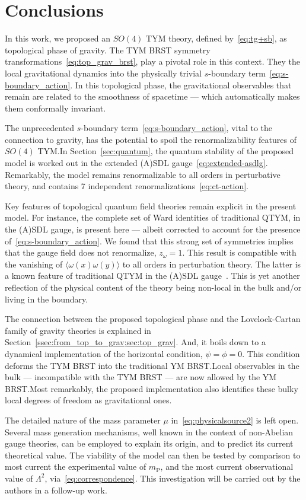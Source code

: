 \documentclass[main.tex]{subfiles}
\begin{document}
\section{Conclusions}%
\label{sec:conclusions}

In this work, we proposed an $ SO \left( 4 \right) $ TYM theory, defined by~\eqref{eq:tg+sb}, as topological phase of gravity. The TYM BRST symmetry transformations~\eqref{eq:top_grav_brst}, play a pivotal role in this context. They  the local gravitational dynamics into the physically trivial $s$-boundary term~\eqref{eq:s-boundary_action}. In this topological phase, the gravitational observables that remain are related to the smoothness of spacetime --- which automatically makes them conformally invariant.

The unprecedented $ s $-boundary term~\eqref{eq:s-boundary_action}, vital to the connection to gravity, has the potential to spoil the renormalizability features of $ SO(4) $ TYM.\@ In Section~\ref{sec:quantum}, the quantum stability of the proposed model is worked out in the extended (A){}SDL gauge~\eqref{eq:extended-asdlg}. Remarkably, the model remains renormalizable to all orders in perturbative theory, and contains 7 independent renormalizations~\eqref{eq:ct-action}.

Key features of topological quantum field theories remain explicit in the present model. For instance, the complete set of Ward identities of traditional QTYM, in the (A){}SDL gauge, is present here --- albeit corrected to account for the presence of~\eqref{eq:s-boundary_action}. We found that this strong set of symmetries implies that the gauge field does not renormalize, $ z_{ \omega } = 1 $. This result is compatible with the vanishing of $ \langle \omega(x) \omega(y) \rangle $ to all orders in perturbation theory. The latter is a known feature of traditional QTYM in the (A){}SDL gauge~\cite{sadovski2017c,sadovski2018a}. This is yet another reflection of the physical content of the theory being non-local in the bulk and/or living in the boundary.

The connection between the proposed topological phase and the Lovelock-Cartan family of gravity theories is explained in Section~\ref{ssec:from_top_to_grav;sec:top_grav}. And, it boils down to a dynamical implementation of the horizontal condition, $ \psi = \phi = 0 $. This condition deforms the TYM BRST into the traditional YM BRST.\@ Local observables in the bulk --- incompatible with the TYM BRST --- are now allowed by the YM BRST.\@ Most remarkably, the proposed implementation also identifies these bulky local degrees of freedom as gravitational ones.

The detailed nature of the mass parameter $ \mu $ in~\eqref{eq:physicalsource2} is left open. Several mass generation mechanisms, well known in the context of non-Abelian gauge theories, can be employed to explain its origin, and to predict its current theoretical value. The viability of the model can then be tested by comparison to most current the experimental value of $ m_{ \text{P} } $, and the most current observational value of $ \Lambda^2 $, via~\eqref{eq:correspondence}. This investigation will be carried out by the authors in a follow-up work.
\end{document}
